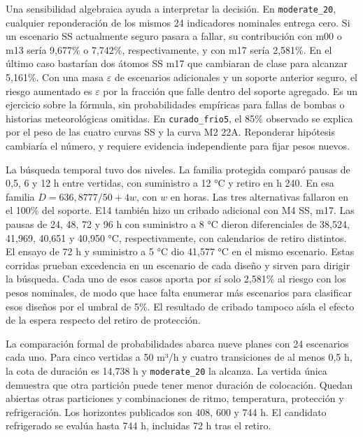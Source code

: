 \documentclass[11pt,a4paper]{article}
\newcommand{\plan}[1]{\texttt{#1}}
\begin{document}
Una sensibilidad algebraica ayuda a interpretar la decisión. En \plan{moderate\_20}, cualquier reponderación de los mismos 24 indicadores nominales entrega cero. Si un escenario SS actualmente seguro pasara a fallar, su contribución con m00 o m13 sería 9,677\% o 7,742\%, respectivamente, y con m17 sería 2,581\%. En el último caso bastarían dos átomos SS m17 que cambiaran de clase para alcanzar 5,161\%. Con una masa $\varepsilon$ de escenarios adicionales y un soporte anterior seguro, el riesgo aumentado es $\varepsilon$ por la fracción que falle dentro del soporte agregado. Es un ejercicio sobre la fórmula, sin probabilidades empíricas para fallas de bombas o historias meteorológicas omitidas. En \plan{curado\_frio5}, el 85\% observado se explica por el peso de las cuatro curvas SS y la curva M2 22A. Reponderar hipótesis cambiaría el número, y requiere evidencia independiente para fijar pesos nuevos.

La búsqueda temporal tuvo dos niveles. La familia protegida comparó pausas de 0,5, 6 y 12 h entre vertidas, con suministro a 12 °C y retiro en h 240. En esa familia $D=636{,}8777/50+4w$, con $w$ en horas. Las tres alternativas fallaron en el 100\% del soporte. E14 también hizo un cribado adicional con M4 SS, m17. Las pausas de 24, 48, 72 y 96 h con suministro a 8 °C dieron diferenciales de 38,524, 41,969, 40,651 y 40,950 °C, respectivamente, con calendarios de retiro distintos. El ensayo de 72 h y suministro a 5 °C dio 41,577 °C en el mismo escenario. Estas corridas prueban excedencia en un escenario de cada diseño y sirven para dirigir la búsqueda. Cada uno de esos casos aporta por sí solo 2,581\% al riesgo con los pesos nominales, de modo que hace falta enumerar más escenarios para clasificar esos diseños por el umbral de 5\%. El resultado de cribado tampoco aísla el efecto de la espera respecto del retiro de protección.

La comparación formal de probabilidades abarca nueve planes con 24 escenarios cada uno. Para cinco vertidas a 50 m³/h y cuatro transiciones de al menos 0,5 h, la cota de duración es 14,738 h y \plan{moderate\_20} la alcanza. La vertida única demuestra que otra partición puede tener menor duración de colocación. Quedan abiertas otras particiones y combinaciones de ritmo, temperatura, protección y refrigeración. Los horizontes publicados son 408, 600 y 744 h. El candidato refrigerado se evalúa hasta 744 h, incluidas 72 h tras el retiro.
\end{document}
